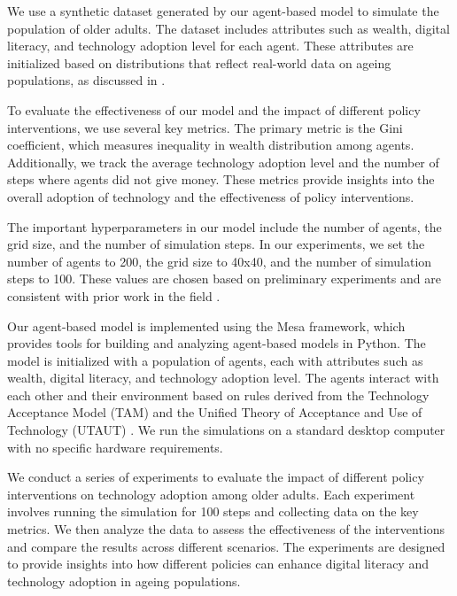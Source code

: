 \documentclass{article} %
\begin{document}
We use a synthetic dataset generated by our agent-based model to simulate the population of older adults. The dataset includes attributes such as wealth, digital literacy, and technology adoption level for each agent. These attributes are initialized based on distributions that reflect real-world data on ageing populations, as discussed in \citet{park2023generative}.

To evaluate the effectiveness of our model and the impact of different policy interventions, we use several key metrics. The primary metric is the Gini coefficient, which measures inequality in wealth distribution among agents. Additionally, we track the average technology adoption level and the number of steps where agents did not give money. These metrics provide insights into the overall adoption of technology and the effectiveness of policy interventions.

The important hyperparameters in our model include the number of agents, the grid size, and the number of simulation steps. In our experiments, we set the number of agents to 200, the grid size to 40x40, and the number of simulation steps to 100. These values are chosen based on preliminary experiments and are consistent with prior work in the field \citep{poledna2023economic}.

Our agent-based model is implemented using the Mesa framework, which provides tools for building and analyzing agent-based models in Python. The model is initialized with a population of agents, each with attributes such as wealth, digital literacy, and technology adoption level. The agents interact with each other and their environment based on rules derived from the Technology Acceptance Model (TAM) and the Unified Theory of Acceptance and Use of Technology (UTAUT) \citep{zhou2023peer}. We run the simulations on a standard desktop computer with no specific hardware requirements.

We conduct a series of experiments to evaluate the impact of different policy interventions on technology adoption among older adults. Each experiment involves running the simulation for 100 steps and collecting data on the key metrics. We then analyze the data to assess the effectiveness of the interventions and compare the results across different scenarios. The experiments are designed to provide insights into how different policies can enhance digital literacy and technology adoption in ageing populations.
\end{document}
